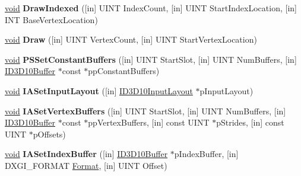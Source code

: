 \begin{DoxyCompactItemize}
\hyperlink{interfacevoid}{void} {\bfseries Draw\+Indexed} (\mbox{[}in\mbox{]} U\+I\+NT Index\+Count, \mbox{[}in\mbox{]} U\+I\+NT Start\+Index\+Location, \mbox{[}in\mbox{]} I\+NT Base\+Vertex\+Location)
\item 
\mbox{\label{interface_i_d3_d10_device_a9df22acd4f7e6e72d342ea3de6d4ad2d}} 
\hyperlink{interfacevoid}{void} {\bfseries Draw} (\mbox{[}in\mbox{]} U\+I\+NT Vertex\+Count, \mbox{[}in\mbox{]} U\+I\+NT Start\+Vertex\+Location)
\item 
\mbox{\label{interface_i_d3_d10_device_a6a6abd0f026dbdc5a1a88af060ea06cb}} 
\hyperlink{interfacevoid}{void} {\bfseries P\+S\+Set\+Constant\+Buffers} (\mbox{[}in\mbox{]} U\+I\+NT Start\+Slot, \mbox{[}in\mbox{]} U\+I\+NT Num\+Buffers, \mbox{[}in\mbox{]} \hyperlink{interface_i_d3_d10_buffer}{I\+D3\+D10\+Buffer} $\ast$const $\ast$pp\+Constant\+Buffers)
\item 
\mbox{\label{interface_i_d3_d10_device_a55277fa2c3fe2538feda9f6a367d5cb0}} 
\hyperlink{interfacevoid}{void} {\bfseries I\+A\+Set\+Input\+Layout} (\mbox{[}in\mbox{]} \hyperlink{interface_i_d3_d10_input_layout}{I\+D3\+D10\+Input\+Layout} $\ast$p\+Input\+Layout)
\item 
\mbox{\label{interface_i_d3_d10_device_ac991f5ef8cdce71cf84de0bf8d7c8dcd}} 
\hyperlink{interfacevoid}{void} {\bfseries I\+A\+Set\+Vertex\+Buffers} (\mbox{[}in\mbox{]} U\+I\+NT Start\+Slot, \mbox{[}in\mbox{]} U\+I\+NT Num\+Buffers, \mbox{[}in\mbox{]} \hyperlink{interface_i_d3_d10_buffer}{I\+D3\+D10\+Buffer} $\ast$const $\ast$pp\+Vertex\+Buffers, \mbox{[}in\mbox{]} const U\+I\+NT $\ast$p\+Strides, \mbox{[}in\mbox{]} const U\+I\+NT $\ast$p\+Offsets)
\item 
\mbox{\label{interface_i_d3_d10_device_aa1db6456593bb71c450de8fbd2b267de}} 
\hyperlink{interfacevoid}{void} {\bfseries I\+A\+Set\+Index\+Buffer} (\mbox{[}in\mbox{]} \hyperlink{interface_i_d3_d10_buffer}{I\+D3\+D10\+Buffer} $\ast$p\+Index\+Buffer, \mbox{[}in\mbox{]} D\+X\+G\+I\+\_\+\+F\+O\+R\+M\+AT \hyperlink{struct_format}{Format}, \mbox{[}in\mbox{]} U\+I\+NT Offset)
\item 
\mbox{\label{interface_i_d3_d10_device_ae98ea6eb6f84c0cd6b51b8289cc0e57d}} 

\end{DoxyCompactItemize}
